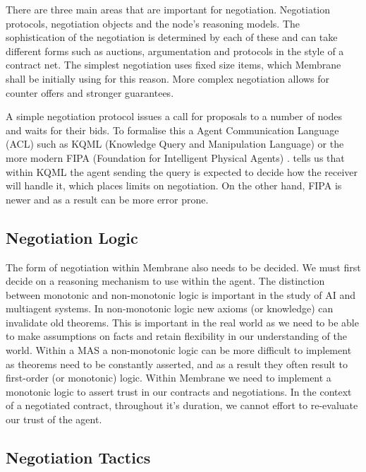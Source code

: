 \documentclass[11pt, a4paper, twocolumn, twoside]{report}
\begin{document}
There are three main areas that are important for negotiation. Negotiation protocols, negotiation objects and the node's reasoning models. \citep{beer1999negotiation} The sophistication of the negotiation is determined by each of these and can take different forms such as auctions, argumentation and protocols in the style of a contract net. The simplest negotiation uses fixed size items, which Membrane shall be initially using for this reason. More complex negotiation allows for counter offers and stronger guarantees.

A simple negotiation protocol issues a call for proposals to a number of nodes and waits for their bids. To formalise this a Agent Communication Language (ACL) such as KQML (Knowledge Query and Manipulation Language) \citep{finin1992specification} or the more modern FIPA (Foundation for Intelligent Physical Agents) \citep{fipa2002fipa}. \citep{rahwan2005interest} \cite{beer1999negotiation} tells us that within KQML the agent sending the query is expected to decide how the receiver will handle it, which places limits on negotiation. On the other hand, FIPA is newer and as a result can be more error prone.

\subsection{Negotiation Logic}

The form of negotiation within Membrane also needs to be decided. We must first decide on a reasoning mechanism to use within the agent. The distinction between monotonic and non-monotonic logic is important in the study of AI and multiagent systems. In non-monotonic logic new axioms (or knowledge) can invalidate old theorems. \citep*{mcdermott1980non, antonelli2008non} This is important in the real world as we need to be able to make assumptions on facts and retain flexibility in our understanding of the world. Within a MAS a non-monotonic logic can be more difficult to implement as theorems need to be constantly asserted, and as a result they often result to first-order (or monotonic) logic. Within Membrane we need to implement a monotonic logic to assert trust in our contracts and negotiations. In the context of a negotiated contract, throughout it's duration, we cannot effort to re-evaluate our trust of the agent.

\subsection{Negotiation Tactics}
\end{document}
